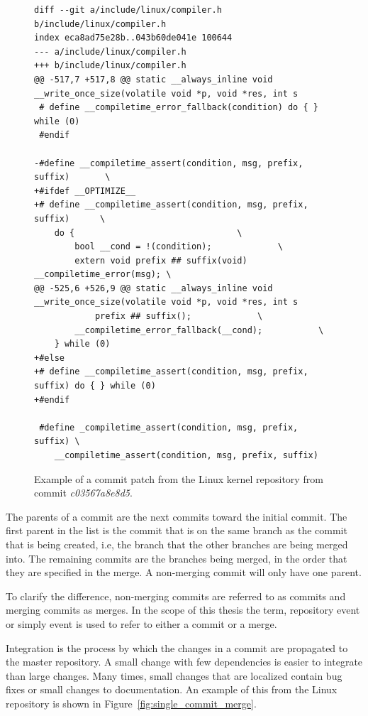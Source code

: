 \begin{figure}[htpb]
  \centering
  \scriptsize{
  \begin{verbatim}
diff --git a/include/linux/compiler.h b/include/linux/compiler.h
index eca8ad75e28b..043b60de041e 100644
--- a/include/linux/compiler.h
+++ b/include/linux/compiler.h
@@ -517,7 +517,8 @@ static __always_inline void __write_once_size(volatile void *p, void *res, int s
 # define __compiletime_error_fallback(condition) do { } while (0)
 #endif

-#define __compiletime_assert(condition, msg, prefix, suffix)		\
+#ifdef __OPTIMIZE__
+# define __compiletime_assert(condition, msg, prefix, suffix)		\
 	do {								\
 		bool __cond = !(condition);				\
 		extern void prefix ## suffix(void) __compiletime_error(msg); \
@@ -525,6 +526,9 @@ static __always_inline void __write_once_size(volatile void *p, void *res, int s
 			prefix ## suffix();				\
 		__compiletime_error_fallback(__cond);			\
 	} while (0)
+#else
+# define __compiletime_assert(condition, msg, prefix, suffix) do { } while (0)
+#endif

 #define _compiletime_assert(condition, msg, prefix, suffix) \
 	__compiletime_assert(condition, msg, prefix, suffix)
  \end{verbatim}
}
  \caption{Example of a commit patch from the Linux kernel repository
    from commit \textit{c03567a8e8d5}.}
  \label{fig:commit_patch}
\end{figure}

The parents of a commit are the next commits toward the initial commit.
The first parent in the list is the commit that is on the same branch
as the commit that is being created, i.e, the branch that the other
branches are being merged into.
The remaining commits are the branches being merged, in the order that
they are specified in the merge.
A non-merging commit will only have one parent.

To clarify the difference, non-merging commits are referred to as
commits and merging commits as merges.
In the scope of this thesis the term, repository event or simply event
is used to refer to either a commit or a merge.

Integration is the process by which the changes in a commit are
propagated to the master repository.
A small change with few dependencies is easier to integrate than large changes.
Many times, small changes that are localized contain bug fixes or small
changes to documentation.
An example of this from the Linux repository is shown in
Figure~\ref{fig:single_commit_merge}.

